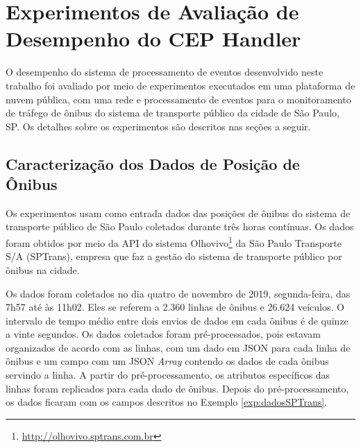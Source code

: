 \chapter{Experimentos de Avaliação de Desempenho do CEP Handler}
\label{cap:experimento}

O desempenho do sistema de processamento de eventos desenvolvido neste trabalho foi avaliado por meio de experimentos executados em uma plataforma de nuvem pública, com uma rede e processamento de eventos para o monitoramento de tráfego de ônibus do sistema de transporte público da cidade de São Paulo, SP. Os detalhes sobre os experimentos são descritos nas seções a seguir.

\section{Caracterização dos Dados de Posição de Ônibus}

Os experimentos usam como entrada dados das posições de ônibus do sistema de transporte público de São Paulo coletados durante três horas contínuas. Os dados foram obtidos por meio da API do sistema Olhovivo\footnote{\url{http://olhovivo.sptrans.com.br}} da São Paulo Transporte S/A (SPTrans), empresa que faz a gestão do sistema de transporte público por ônibus na cidade.

Os dados foram coletados no dia quatro de novembro de 2019, segunda-feira, das 7h57 até às 11h02. Eles se referem a 2.360 linhas de ônibus e 26.624 veículos. O intervalo de tempo médio entre dois envios de dados em cada ônibus é de quinze a vinte segundos.
Os dados coletados foram pré-processados, pois estavam organizados de acordo com as linhas, com um dado em JSON para cada linha de ônibus e um campo com um JSON \textit{Array} contendo os dados de cada ônibus servindo a linha. A partir do pré-processamento, os atributos específicos das linhas foram replicados para cada dado de ônibus.
Depois do pré-processamento, os dados ficaram com os campos descritos no Exemplo \ref{exp:dadosSPTrans}.

